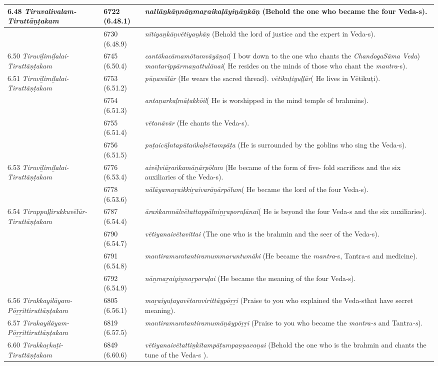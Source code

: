 \begin{longtable}{|m{2.7cm}|m{2.7cm}|>{\raggedright}m{3.1cm}|}
\hline
6.48 \textit{Tiruvalivalam- Tiruttāṇṭakam} & 6722 (6.48.1) & \textit{nallāṉkāṇnāṉmaṟai\-kaḷāyiṉāṉkāṇ} (Behold the one who became the four Veda-s). \tabularnewline
\hline
 & 6730 (6.48.9) & \textit{nītiyaṉkāṇvētiyaṉkāṇ} (Behold the lord of justice and the expert in Veda-s). \tabularnewline
\hline
6.50 \textit{Tiruvīḻimiḻalai- Tiruttāṇṭakam} & 6745 (6.50.4) & \textit{cantōkacāmamōtumvā\-yāṉai}( I bow down to the one who chants the \textit{ChandogaSāma Veda}) \textit{mantarippārmaṉattulānai}( He resides on the minds of those who chant the \textit{mantra}-s). \tabularnewline
\hline
6.51 \textit{Tiruvīḻimiḻalai- Tiruttāṇṭakam} & 6753 (6.51.2) & \textit{pūṇanūlār} (He wears the sacred thread). \textit{vētikuṭiyuḷḷār}( He lives in Vētikuṭi). \tabularnewline
\hline
 & 6754 (6.51.3) & \textit{antaṇarkaḷmāṭakkōil}( He is worshipped in the mind temple of brahmins). \tabularnewline
\hline
 & 6755 (6.51.4) & \textit{vētanāvār} (He chants the Veda-s). \tabularnewline
\hline
 & 6756 (6.51.5) & \textit{puṭaicūḻntapūtaṅkaḷ\-vētampāṭa} (He is surrounded by the goblins\index{goblins} who sing the Veda-s). \tabularnewline
\hline
6.53\textit{ Tiruvīḻimiḻalai- Tiruttāṇṭakam} & 6776 (6.53.4) & \textit{aivēḷviāṟaṅkamāṉār\-pōlum} (He became of the form of five- fold sacrifices and the six auxiliaries of the Veda-s). \tabularnewline
\hline
 & 6778 (6.53.6) & \textit{nālāyamaṟaikkiṟaiva\-rāṉārpōlum}( He became the lord of the four Veda-s). \tabularnewline
\hline
6.54 \textit{Tiruppuḷḷirukkuvēlūr- Tiruttāṇṭakam} & 6787 (6.54.4) & \textit{āraṅkamnālvētatta\-ppālniṉṟaporuḷānai}( He is beyond the four Veda-s and the six auxiliaries). \tabularnewline
\hline
 & 6790 (6.54.7) & \textit{vētiyanaivētavittai} (The one who is the brahmin and the seer of the Veda-s). \tabularnewline
\hline
 & 6791 (6.54.8) & \textit{mantiramumtantira\-mummaruntumāki} (He became the \textit{mantra}-s, Tantra-s\index{tantra@\textit{tantra}} and medicine). \tabularnewline
\hline
 & 6792 (6.54.9) & \textit{nāṉmaṟaiyiṉnaṟporuḷai} (He became the meaning of the four Veda-s). \tabularnewline
\hline
6.56 \textit{Tirukkayilāyam-Pōṟṟittiruttāṇṭakam} & 6805 (6.56.1) & \textit{maṟaiyuṭayavētamviri\-ttāypōṟṟi} (Praise to you who explained the Veda-sthat have secret meaning). \tabularnewline
\hline
6.57 \textit{Tirukayilāyam- Pōṟṟittiruttāṇṭakam} & 6819 (6.57.5) & \textit{mantiramumtantira\-mumāṉāypōṟṟi} (Praise to you who became the \textit{mantra-s} and Tantra\textit{-s}). \tabularnewline
\hline
6.60 \textit{Tirukkaṟkuṭi- Tiruttāṇṭakam} & 6849 (6.60.6) & \textit{vētiyanaivētattiṉkītam\-pāṭumpaṇṇavaṉai} (Behold the one who is the brahmin and chants the tune of the Veda-s ). \tabularnewline

\end{longtable}
